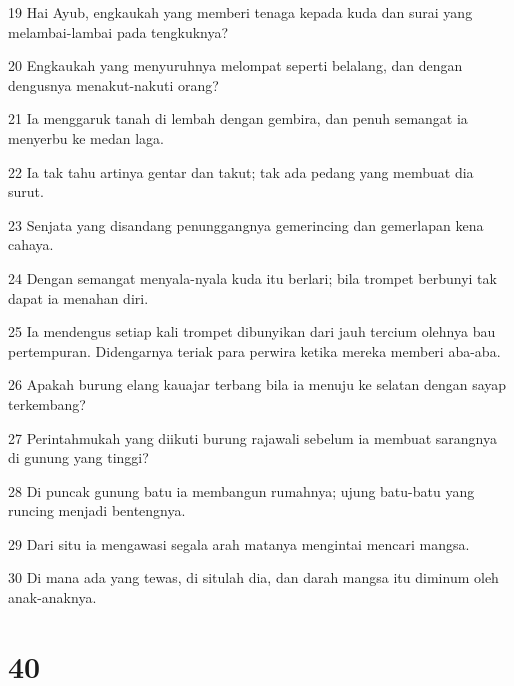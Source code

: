 \par 19 Hai Ayub, engkaukah yang memberi tenaga kepada kuda dan surai yang melambai-lambai pada tengkuknya?
\par 20 Engkaukah yang menyuruhnya melompat seperti belalang, dan dengan dengusnya menakut-nakuti orang?
\par 21 Ia menggaruk tanah di lembah dengan gembira, dan penuh semangat ia menyerbu ke medan laga.
\par 22 Ia tak tahu artinya gentar dan takut; tak ada pedang yang membuat dia surut.
\par 23 Senjata yang disandang penunggangnya gemerincing dan gemerlapan kena cahaya.
\par 24 Dengan semangat menyala-nyala kuda itu berlari; bila trompet berbunyi tak dapat ia menahan diri.
\par 25 Ia mendengus setiap kali trompet dibunyikan dari jauh tercium olehnya bau pertempuran. Didengarnya teriak para perwira ketika mereka memberi aba-aba.
\par 26 Apakah burung elang kauajar terbang bila ia menuju ke selatan dengan sayap terkembang?
\par 27 Perintahmukah yang diikuti burung rajawali sebelum ia membuat sarangnya di gunung yang tinggi?
\par 28 Di puncak gunung batu ia membangun rumahnya; ujung batu-batu yang runcing menjadi bentengnya.
\par 29 Dari situ ia mengawasi segala arah matanya mengintai mencari mangsa.
\par 30 Di mana ada yang tewas, di situlah dia, dan darah mangsa itu diminum oleh anak-anaknya.

\chapter{40}

